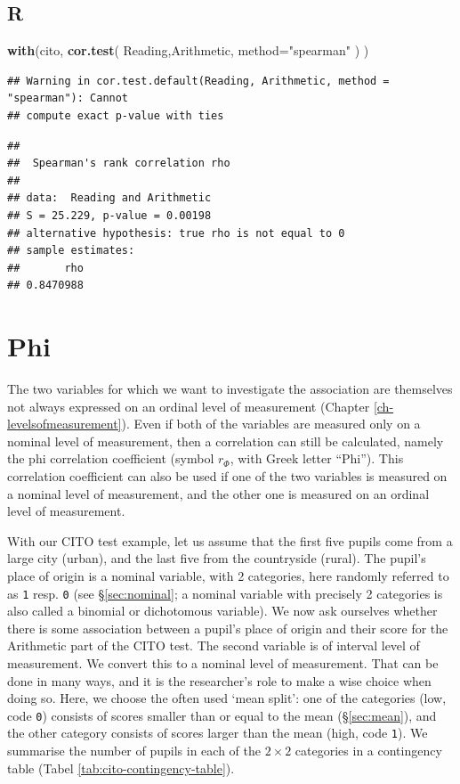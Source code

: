 \documentclass[
]{book}
\newenvironment{Shaded}{\begin{snugshade}}{\end{snugshade}}
\newcommand{\AttributeTok}[1]{\textcolor[rgb]{0.13,0.29,0.53}{#1}}
\newcommand{\FunctionTok}[1]{\textcolor[rgb]{0.13,0.29,0.53}{\textbf{#1}}}
\newcommand{\NormalTok}[1]{#1}
\newcommand{\StringTok}[1]{\textcolor[rgb]{0.31,0.60,0.02}{#1}}
\begin{document}
\subsection{R}\label{r-9}

\begin{Shaded}
\begin{Highlighting}[]
\FunctionTok{with}\NormalTok{(cito, }\FunctionTok{cor.test}\NormalTok{( Reading,Arithmetic, }\AttributeTok{method=}\StringTok{"spearman"}\NormalTok{ ) )}
\end{Highlighting}
\end{Shaded}

\begin{verbatim}
## Warning in cor.test.default(Reading, Arithmetic, method = "spearman"): Cannot
## compute exact p-value with ties
\end{verbatim}

\begin{verbatim}
## 
##  Spearman's rank correlation rho
## 
## data:  Reading and Arithmetic
## S = 25.229, p-value = 0.00198
## alternative hypothesis: true rho is not equal to 0
## sample estimates:
##       rho 
## 0.8470988
\end{verbatim}

\section{Phi}\label{sec:Phi}

The two variables for which we want to investigate the association are themselves
not always expressed on an ordinal level of measurement (Chapter \ref{ch-levelsofmeasurement}).
Even if both of the variables are measured only on a nominal level of measurement,
then a correlation can still be calculated, namely the phi correlation coefficient
(symbol \(r_\Phi\), with Greek letter ``Phi''). This correlation coefficient can also be used
if one of the two variables is measured on a nominal level of measurement,
and the other one is measured on an ordinal level of measurement.

With our CITO test example, let us assume that the first five
pupils come from a large city (urban), and the last five from the
countryside (rural). The pupil's place of origin is a nominal variable,
with 2 categories, here randomly referred to as \texttt{1} resp. \texttt{0} (see
§\ref{sec:nominal}; a nominal variable with precisely 2
categories is also called a binomial or dichotomous variable).
We now ask ourselves whether there is some association between a
pupil's place of origin and their score for the Arithmetic part of the CITO test.
The second variable is of interval level of measurement. We convert this to a
nominal level of measurement. That can be done in many ways, and it is the
researcher's role to make a wise choice when doing so. Here, we
choose the often used `mean split': one of the categories (low, code \texttt{0})
consists of scores smaller than or equal to the mean
(§\ref{sec:mean}), and the other category consists of scores larger
than the mean (high, code \texttt{1}). We summarise the number of pupils in each of the
\(2\times 2\) categories in a contingency table
(Tabel \ref{tab:cito-contingency-table}).
\end{document}
